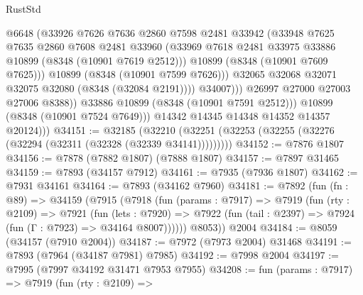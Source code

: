 \begin{lexlean}{RustStd}
\begin{coremodule}
                            @6648
                            (@33926
                              @7626
                              @7636
                              @2860
                              @7598
                              @2481
                              @33942
                              (@33948
                                @7625
                                @7635
                                @2860
                                @7608
                                @2481
                                @33960
                                (@33969
                                  @7618
                                  @2481
                                  @33975
                                  @33886
                                  @10899
                                  (@8348 (@10901 @7619 @2512)))
                                @10899
                                (@8348 (@10901 @7609 @7625)))
                              @10899
                              (@8348 (@10901 @7599 @7626)))
                            @32065
                            @32068
                            @32071
                            @32075
                            @32080
                            (@8348 (@32084 @2191))))
                        @34007)))
                  @26997
                  @27000
                  @27003
                  @27006
                  @8388))
              @33886
              @10899
              (@8348 (@10901 @7591 @2512)))
            @10899
            (@8348 (@10901 @7524 @7649)))
          @14342
          @14345
          @14348
          @14352
          @14357
          @20124)))
@34151 := @32185
    (@32210 (@32251 (@32253 (@32255 (@32276 (@32294 (@32311 (@32328 (@32339 @34141)))))))))
@34152 := @7876 @1807
@34156 := @7878 (@7882 @1807) (@7888 @1807)
@34157 := @7897 @31465
@34159 := @7893 (@34157 @7912)
@34161 := @7935 (@7936 @1807)
@34162 := @7931 @34161
@34164 := @7893 (@34162 @7960)
@34181 := @7892
    (fun (fn : @89) =>
    @34159
      (@7915
        (@7918
          (fun (params : @7917) =>
          @7919
            (fun (rty : @2109) =>
            @7921
              (fun (lets : @7920) =>
              @7922 (fun (tail : @2397) => @7924 (fun (Γ : @7923) => @34164 @8007))))))
        @8053))
    @2004
@34184 := @8059 (@34157 (@7910 @2004))
@34187 := @7972 (@7973 @2004) @31468
@34191 := @7893 (@7964 (@34187 @7981) @7985)
@34192 := @7998 @2004
@34197 := @7995 (@7997 @34192 @31471 @7953 @7955)
@34208 := fun (params : @7917) =>
  @7919
    (fun (rty : @2109) =>

\end{coremodule}
\end{lexlean}
